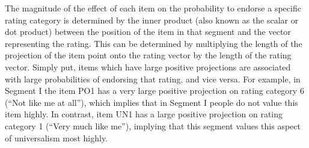 \documentclass[12pt,letter]{article}\usepackage[]{graphicx}\usepackage[]{xcolor}
\begin{document}
The magnitude of the effect of each item on the probability to endorse a specific rating category is determined by the inner product (also known as the scalar or dot product) between the position of the item in that segment and the vector representing the rating. This can be determined by multiplying the length of the projection of the item point onto the rating vector by the length of the rating vector. Simply put, items which have large positive projections are associated with large probabilities of endorsing that rating, and vice versa. For example, in Segment I the item PO1 has a very large positive projection on rating category 6 (``Not like me at all''), which implies that in Segment I people do not value this item highly. In contrast, item UN1 has a large positive projection on rating category 1 (``Very much like me''), implying that this segment values this aspect of universalism most highly.
\end{document}
